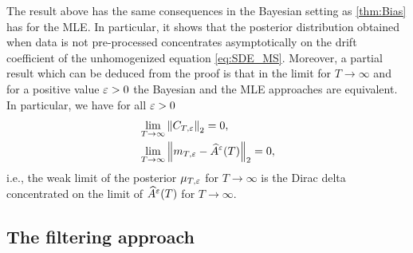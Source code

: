 \documentclass[review,onefignum,onetabnum]{siamonline190516}
\begin{document}
\begin{remark} The result above has the same consequences in the Bayesian setting as \cref{thm:Bias} has for the MLE. In particular, it shows that the posterior distribution obtained when data is not pre-processed concentrates asymptotically on the drift coefficient of the unhomogenized equation \eqref{eq:SDE_MS}. Moreover, a partial result which can be deduced from the proof is that in the limit for $T \to \infty$ and for a positive value $\varepsilon > 0$ the Bayesian and the MLE approaches are equivalent. In particular, we have for all $\varepsilon > 0$
	\begin{equation}
	\begin{aligned}
		&\lim_{T\to\infty} \left\|C_{T,\varepsilon}\right\|_2 = 0,\\
		&\lim_{T \to\infty}\left\|m_{T,\varepsilon} - \widehat A^\varepsilon(T)\right\|_2 =0,
	\end{aligned}	
	\end{equation} 
	i.e., the weak limit of the posterior $\mu_{T,\varepsilon}$ for $T\to \infty$ is the Dirac delta concentrated on the limit of $\widehat A^\varepsilon(T)$ for $T\to \infty$. 
\end{remark}

\subsection{The filtering approach}\label{sec:BayesianFilter}
\end{document}
